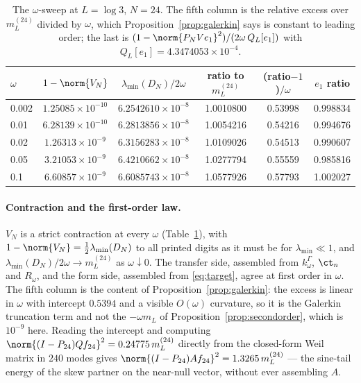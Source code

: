 \begin{table}[ht]\centering\small
\caption{The $\omega$-sweep at $L=\log3$, $N=24$. The fifth column is the
relative excess over $m_L^{(24)}$ divided by $\omega$, which
Proposition~\ref{prop:galerkin} says is constant to leading order; the last is
$(1-\norm{P_NVe_1}^2)/(2\omega\,Q_L[e_1])$ with
$Q_L[e_1]=4.3474053\times10^{-4}$.}\label{tab:sweep}
\begin{tabular}{@{}lccccc@{}}
\toprule
$\omega$ & $1-\norm{V_N}$ & $\lambda_{\min}(D_N)/2\omega$ & ratio to $m_L^{(24)}$ & (ratio$-1$)$/\omega$ & $e_1$ ratio\\
\midrule
0.002 & $1.25085\times10^{-10}$ & $6.2542610\times10^{-8}$ & 1.0010800 & 0.53998 & 0.998834\\
0.01 & $6.28139\times10^{-10}$ & $6.2813856\times10^{-8}$ & 1.0054216 & 0.54216 & 0.994676\\
0.02 & $1.26313\times10^{-9}$ & $6.3156283\times10^{-8}$ & 1.0109026 & 0.54513 & 0.990607\\
0.05 & $3.21053\times10^{-9}$ & $6.4210662\times10^{-8}$ & 1.0277794 & 0.55559 & 0.985816\\
0.1 & $6.60857\times10^{-9}$ & $6.6085743\times10^{-8}$ & 1.0577926 & 0.57793 & 1.002027\\
\bottomrule
\end{tabular}
\end{table}

\paragraph{Contraction and the first-order law.} $V_N$ is a strict contraction
at every $\omega$ (Table~\ref{tab:sweep}), with $1-\norm{V_N}=\frac12\lambda_{\min}(D_N)$
to all printed digits as it must be for $\lambda_{\min}\ll1$, and
$\lambda_{\min}(D_N)/2\omega\to m_L^{(24)}$ as $\omega\downarrow0$. The transfer
side, assembled from $k^\Gamma_\omega$, $\ct_n$ and $R_\omega$, and the form
side, assembled from \eqref{eq:target}, agree at first order in $\omega$. The
fifth column is the content of Proposition~\ref{prop:galerkin}: the excess is
linear in $\omega$ with intercept $0.5394$ and a visible $O(\omega)$ curvature,
so it is the Galerkin truncation term and not the $-\omega m_L$ of
Proposition~\ref{prop:secondorder}, which is $10^{-9}$ here. Reading the
intercept and computing $\norm{(I-P_{24})Qf_{24}}^2=0.24775\,m_L^{(24)}$ directly
from the closed-form Weil matrix in $240$ modes gives
$\norm{(I-P_{24})Af_{24}}^2=1.3265\,m_L^{(24)}$ --- the sine-tail energy of the
skew partner on the near-null vector, without ever assembling $A$.

